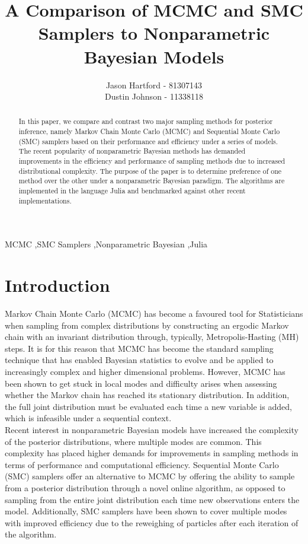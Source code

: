 \documentclass[12pt]{elsarticle}
\begin{document}
	
\begin{frontmatter}
\title{A Comparison of MCMC and SMC Samplers to Nonparametric Bayesian Models}
\author{Jason Hartford - 81307143 \\ Dustin Johnson - 11338118}

\begin{abstract}
In this paper, we compare and contrast two major sampling methods for posterior inference, namely Markov Chain Monte Carlo (MCMC) and Sequential Monte Carlo (SMC) samplers based on their performance and efficiency under a series of models. The recent popularity of nonparametric Bayesian methods has demanded improvements in the efficiency and performance of sampling methods due to increased distributional complexity.  The purpose of the paper is to determine preference of one method over the other under a nonparametric Bayesian paradigm. The algorithms are implemented in the language Julia and benchmarked against other recent implementations.
\end{abstract}

\begin{keyword}
MCMC \sep SMC Samplers \sep Nonparametric Bayesian \sep Julia
\end{keyword}

\end{frontmatter}



\section*{Introduction}
Markov Chain Monte Carlo (MCMC) has become a favoured tool for Statisticians when sampling from complex distributions by constructing an ergodic Markov chain with an invariant distribution through, typically, Metropolis-Hasting (MH) steps. It is for this reason that MCMC has become the standard sampling technique that has enabled Bayesian statistics to evolve and be applied to increasingly complex and higher dimensional problems. However, MCMC has been shown to get stuck in local modes and difficulty arises when assessing whether the Markov chain has reached its stationary distribution. In addition, the full joint distribution must be evaluated each time a new variable is added, which is infeasible under a sequential context. \\

Recent interest in nonparametric Bayesian models have increased the complexity of the posterior distributions, where multiple modes are common. This complexity has placed higher demands for improvements in sampling methods in terms of performance and computational efficiency. Sequential Monte Carlo (SMC) samplers offer an alternative to MCMC by offering the ability to sample from a posterior distribution through a novel online algorithm, as opposed to sampling from the entire joint distribution each time new observations enters the model.  Additionally, SMC samplers have been shown to cover multiple modes with improved efficiency due to the reweighing of particles after each iteration of the algorithm. \\
\end{document}
